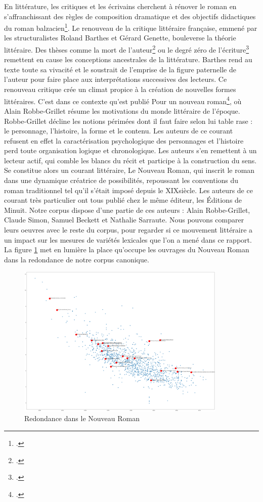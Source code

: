 \documentclass[a4paper,twoside,12pt]{book}
\begin{document}
En littérature, les critiques et les écrivains cherchent à rénover le roman en s'affranchissant des règles de composition dramatique et des objectifs didactiques du roman balzacien\footcites{labouret_litterature_2013}. Le renouveau de la critique littéraire française, emmené par les structuralistes Roland Barthes et Gérard Genette, bouleverse la théorie littéraire. Des thèses comme la mort de l'auteur\footcites{barthes_bruissement_2015} ou le degré zéro de l'écriture\footcites{barthes_degre_1972} remettent en cause les conceptions ancestrales de la littérature. Barthes rend au texte toute sa vivacité et le soustrait de l'emprise de la figure paternelle de l'auteur pour faire place aux interprétations successives des lecteurs. Ce renouveau critique crée un climat propice à la création de nouvelles formes littéraires. C'est dans ce contexte qu'est publié \og Pour un nouveau roman\fg\footcites{robbe-grillet_pour_2013}, où Alain Robbe-Grillet résume les motivations du monde littéraire de l'époque. Robbe-Grillet décline les \og notions périmées\fg{} dont il faut faire selon lui table rase : le  personnage, l’histoire, la forme et le contenu. Les auteurs de ce courant refusent en effet la caractérisation psychologique des personnages et l’histoire perd toute organisation logique et chronologique. Les auteurs s'en remettent à un lecteur actif, qui comble les blancs du récit et participe à la construction du sens. Se constitue alors un courant littéraire, Le Nouveau Roman, qui inscrit le roman dans une dynamique créatrice de possibilités, repoussant les conventions du roman traditionnel tel qu'il s'était imposé depuis le XIX\ieme siècle. Les auteurs de ce courant très particulier ont tous publié chez le même éditeur, les Éditions de Minuit. Notre corpus dispose d'une partie de ces auteurs : Alain Robbe-Grillet, Claude Simon, Samuel Beckett et Nathalie Sarraute. Nous pouvons comparer leurs oeuvres avec le reste du corpus, pour regarder si ce mouvement littéraire a un impact sur les mesures de variétés lexicales que l'on a mené dans ce rapport. La figure \ref{nouveauxromans} met en lumière la place qu'occupe les ouvrages du Nouveau Roman dans la redondance de notre corpus canonique.

\bigskip
\begin{figure}[!ht]
    \centering
    \includegraphics[width=10cm]{img/15_nouveau_roman.png}
    \caption{Redondance dans le Nouveau Roman}
    \label{nouveauxromans}
\end{figure}
\bigskip
\end{document}
